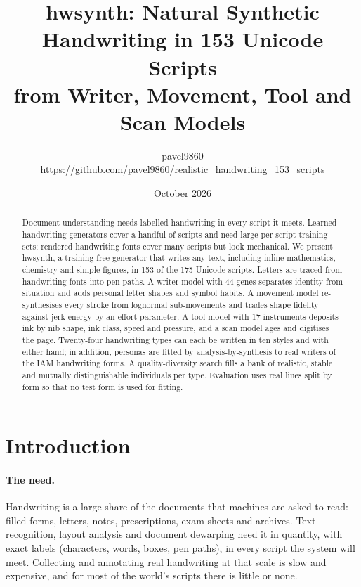 \documentclass[10pt,twocolumn]{article}
\title{\textbf{hwsynth: Natural Synthetic Handwriting in 153 Unicode Scripts\\from Writer, Movement, Tool and Scan Models}}
\author{pavel9860\\\small\url{https://github.com/pavel9860/realistic_handwriting_153_scripts}}
\date{October 2026}
\begin{document}
\maketitle

\begin{abstract}
Document understanding needs labelled handwriting in every script it meets. Learned handwriting generators cover a
handful of scripts and need large per-script training sets; rendered handwriting fonts cover many scripts but look
mechanical. We present \textsf{hwsynth}, a training-free generator that writes any text, including inline
mathematics, chemistry and simple figures, in 153 of the 175 Unicode scripts. Letters are traced from handwriting
fonts into pen paths. A writer model with 44 genes separates identity from situation and adds personal letter
shapes and symbol habits. A movement model re-synthesises every stroke from lognormal sub-movements and trades shape
fidelity against jerk energy by an effort parameter. A tool model with 17 instruments deposits ink by nib shape,
ink class, speed and pressure, and a scan model ages and digitises the page. Twenty-four handwriting types can each
be written in ten styles and with either hand; in addition, personas are fitted by analysis-by-synthesis to real
writers of the IAM handwriting forms. A quality-diversity search fills a bank of realistic, stable and mutually
distinguishable individuals per type. Evaluation uses real lines split by form so that no test form is used for
fitting. 
\end{abstract}

\section{Introduction}
\label{sec:intro}

\paragraph{The need.} Handwriting is a large share of the documents that machines are asked to read: filled
forms, letters, notes, prescriptions, exam sheets and archives. Text recognition, layout analysis and document
dewarping need it in quantity, with exact labels (characters, words, boxes, pen paths), in every script the system
will meet. Collecting and annotating real handwriting at that scale is slow and expensive, and for most of the
world's scripts there is little or none.
\end{document}

